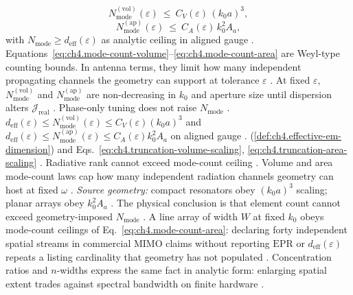 \begin{equation}
\label{eq:ch4.mode-count-volume}
N_{\mathrm{mode}}^{\mathrm{(vol)}}(\varepsilon)\ \le\ C_{V}(\varepsilon)\,(k_{0}a)^{3},
\end{equation}
\begin{equation}
\label{eq:ch4.mode-count-area}
N_{\mathrm{mode}}^{\mathrm{(ap)}}(\varepsilon)\ \le\ C_{A}(\varepsilon)\,k_{0}^{2}A_{a},
\end{equation}
with \(N_{\mathrm{mode}}\ge d_{\mathrm{eff}}(\varepsilon)\) as analytic ceiling in aligned gauge \cite{collin2001}.
Equations~\eqref{eq:ch4.mode-count-volume}--\eqref{eq:ch4.mode-count-area} are Weyl-type counting bounds. In antenna terms, they limit how many
independent propagating channels the geometry can support at tolerance \(\varepsilon\) \cite{stratton1941}.
\label{thm:ch4.mode-count-monotone}
At fixed \(\varepsilon\), \(N_{\mathrm{mode}}^{\mathrm{(vol)}}\) and \(N_{\mathrm{mode}}^{\mathrm{(ap)}}\) are non-decreasing in \(k_{0}\) and aperture size
until dispersion alters \(\mathcal{J}_{\mathrm{real}}\) \cite{stratton1941}. Phase-only tuning does not raise \(N_{\mathrm{mode}}\)
\cite{devaney2004}.
\label{thm:ch4.mode-ceiling-rank}
\(d_{\mathrm{eff}}(\varepsilon)\le N_{\mathrm{mode}}^{\mathrm{(vol)}}(\varepsilon)\le C_{V}(\varepsilon)(k_{0}a)^{3}\) and
\(d_{\mathrm{eff}}(\varepsilon)\le N_{\mathrm{mode}}^{\mathrm{(ap)}}(\varepsilon)\le C_{A}(\varepsilon)k_{0}^{2}A_{a}\) on aligned gauge
\cite{stratton1941}.
(\ref{def:ch4.effective-em-dimension}) and Eqs.~\eqref{eq:ch4.truncation-volume-scaling}, \eqref{eq:ch4.truncation-area-scaling}
\cite{stratton1941}. Radiative rank cannot exceed mode-count ceiling \cite{devaney2004}.
Volume and area mode-count laws cap how many independent radiation channels geometry can host at fixed $\omega$ \cite{collin2001}. \emph{Source geometry:} compact resonators obey $(k_{0}a)^{3}$ scaling; planar arrays obey $k_{0}^{2}A_{a}$ \cite{jackson1999}. The physical conclusion is that element count cannot exceed geometry-imposed $N_{\mathrm{mode}}$ \cite{harrington2001}.
A line array of width $W$ at fixed $k_{0}$ obeys mode-count ceilings of Eq.~\eqref{eq:ch4.mode-count-area}:
declaring forty independent spatial streams in commercial MIMO claims without reporting $\mathrm{EPR}$ or $d_{\mathrm{eff}}(\varepsilon)$ repeats
a listing cardinality that geometry has not populated \cite{collin2001}.
Concentration ratios and $n$-widths express the same fact in analytic form: enlarging spatial extent trades against
spectral bandwidth on finite hardware \cite{devaney2004}.
